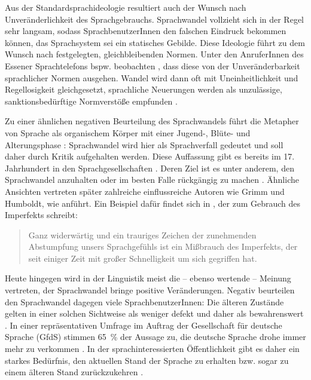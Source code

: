 Aus der Standardsprachideologie resultiert auch der Wunsch nach Unveränderlichkeit des Sprachgebrauchs.
Sprachwandel vollzieht sich in der Regel sehr langsam, sodass SprachbenutzerInnen den falschen Eindruck bekommen können, das Sprachsystem sei ein statisches Gebilde.
Diese Ideologie führt zu dem Wunsch nach festgelegten, gleichbleibenden Normen.
Unter den AnruferInnen des Essener Sprachtelefons bspw. beobachten \citet[125]{Bunting1996}, dass diese von der Unveränderbarkeit sprachlicher Normen ausgehen. 
Wandel wird dann oft mit Uneinheitlichkeit und Regellosigkeit gleichgesetzt, sprachliche Neuerungen werden als unzulässige, {sanktions\-be\-dürf\-ti\-ge} Normverstöße empfunden \citep[s.][34]{Hennig2009}. 

Zu einer ähnlichen negativen Beurteilung des Sprachwandels führt die Metapher von Sprache als organischem Körper mit einer Jugend-, Blüte- und Alterungsphase \citep[s.][89--90]{Kilian2010}: Sprachwandel wird hier als Sprachverfall gedeutet und soll daher durch Kritik aufgehalten werden. 
Diese Auffassung gibt es bereits im 17. Jahrhundert in den Sprachgesellschaften \citep[s.][39]{Hundt.2000}. 
Deren Ziel ist es unter anderem, den Sprachwandel anzuhalten oder im besten Falle rückgängig zu machen \citep[s.][41]{Hundt.2000}.
Ähnliche Ansichten vertreten später zahlreiche einflussreiche Autoren wie Grimm und Humboldt, wie \citet[10--11]{Labov.2006} anführt.
Ein Beispiel dafür findet sich in \citet[]{Wustmann.1911}, der zum Gebrauch des Imperfekts schreibt: 
\begin{quote} Ganz widerwärtig und ein trauriges Zeichen der zunehmenden Abstumpfung unsers Sprachgefühls ist ein Mißbrauch des Imperfekts, der seit einiger Zeit mit großer Schnelligkeit um sich gegriffen hat. \citep[101]{Wustmann.1911}\end{quote}
Heute hingegen wird in der Linguistik meist die -- ebenso wertende -- Meinung vertreten, der Sprachwandel bringe positive Veränderungen. 
Negativ beurteilen den Sprachwandel dagegen viele SprachbenutzerInnen: 
\glqq Die älteren Zustände gelten in einer solchen Sichtweise als weniger defekt und daher als bewahrenswert\grqq{} \citep[89]{Kilian2010}. 
In einer repräsentativen Umfrage im Auftrag der Gesellschaft für deutsche Sprache (GfdS) stimmen 65~\% der Aussage zu, die deutsche Sprache drohe immer mehr zu verkommen \citep[s.][10]{Hoberg.2008}. 
In der sprachinteressierten Öffentlichkeit gibt es daher ein starkes Bedürfnis, den aktuellen Stand der Sprache zu erhalten bzw. sogar zu einem älteren Stand zurückzukehren \citep[s.][13--14]{Cameron1995}. 
